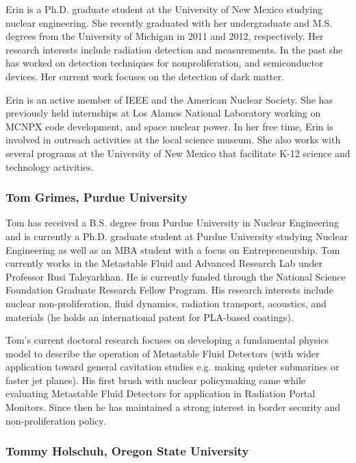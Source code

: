 Erin is a Ph.D. graduate student at the University of New Mexico studying nuclear
engineering. She recently graduated with her undergraduate and M.S. degrees
from the University of Michigan in 2011 and 2012, respectively. Her research
interests include radiation detection and measurements. In the past she has
worked on detection techniques for nonproliferation, and semiconductor
devices. Her current work focuses on the detection of dark matter.

Erin is an active member of IEEE and the American Nuclear Society. She has
previously held internships at Los Alamos National Laboratory working on MCNPX
code development, and space nuclear power. In her free time, Erin is involved in
outreach activities at the local science museum. She also works with several
programs at the University of New Mexico that facilitate K-12 science and
technology activities.

\subsubsection*{Tom Grimes, Purdue University}

Tom has received a B.S. degree from Purdue University in Nuclear Engineering and
is currently a Ph.D. graduate student at Purdue University studying Nuclear
Engineering as well as an MBA student with a focus on Entrepreneurship. Tom
currently works in the Metastable Fluid and Advanced Research Lab under
Professor Rusi Taleyarkhan. He is currently funded through the National Science
Foundation Graduate Research Fellow Program. His research interests include
nuclear non-proliferation, fluid dynamics, radiation transport, acoustics, and
materials (he holds an international patent for PLA-based coatings).

Tom's current doctoral research focuses on developing a fundamental physics
model to describe the operation of Metastable Fluid Detectors (with wider
application toward general cavitation studies e.g. making quieter submarines or
faster jet planes). His first brush with nuclear policymaking came while
evaluating Metastable Fluid Detectors for application in Radiation Portal
Monitors. Since then he has maintained a strong interest in border security and
non-proliferation policy.

\subsubsection*{Tommy Holschuh, Oregon State University}

